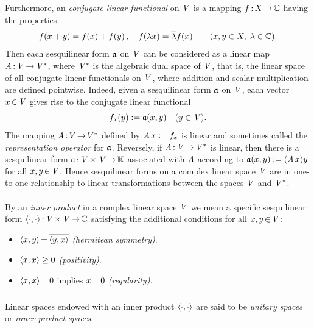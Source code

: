 \documentclass[11pt,twoside]{article}
\begin{document}
\subparagraph{}
Furthermore,
an \textit{conjugate linear functional} on $\mathit{V}$
is a mapping $f {\,:\,}X {\,\to\,} {\mathbb{C}}$ having the properties
\[
f(x+y) = f(x) + f(y)\,, \quad
f(\lambda x) = \overline{\lambda}f(x)
\quad \quad
(x,y \in X, \; \lambda \in {\mathbb{C}}).
\]
Then each sesquilinear form $\mathfrak{a}$ on $\mathit{V}$ can be considered
as a linear map $\mathit{A} {\,:\,}\mathit{V} {\,\to\,} \mathit{V}^*$,
where $\mathit{V}^*$ is the algebraic dual space of $\mathit{V}$,
that is,
the linear space of all conjugate linear functionals on $\mathit{V}$,
where addition and scalar multiplication are defined pointwise.
Indeed,
given a sesquilinear form $\mathfrak{a}$ on $\mathit{V}$,
each vector $x {\,\in\,} \mathit{V}$ gives rise to the conjugate linear functional
\[
f_x(y) := \mathfrak{a}(x,y) \quad (y \in \mathit{V}).
\]
The mapping $\mathit{A} {\,:\,}V {\,\to\,} V^*$ defined by $\mathit{A} \, x := f_x$ is linear
and sometimes called the \textit{representation operator} for $\mathfrak{a}$.
Reversely,
if $\mathit{A} {\,:\,}\mathit{V} {\,\to\,} \mathit{V}^*$ is linear,
then there is a sesquilinear form $\mathfrak{a} {\,:\,}\mathit{V} \times \mathit{V} {\,\to\,} {\mathbb{K}}$
associated with $\mathit{A}$ according to
$
\mathfrak{a}(x,y) := (\mathit{A} \,x) y$ for all $x,y {\,\in\,} \mathit{V}.
$
Hence sesquilinear forms on a complex linear space $\mathit{V}$
are in one-to-one relationship to linear trans\-formations
between the spaces $\mathit{V}$ and $\mathit{V}^*$.

\paragraph{}
By an \textit{inner product} in a complex linear space $\mathit{V}$
we mean a specific sesquilinear form
$\langle \cdot,\cdot \rangle {\,:\,}\mathit{V} {\,\times\,} \mathit{V} {\,\to\,} {\mathbb{C}}$
satisfying the additional conditions for all $x,y {\,\in\,} \mathit{V}$:

\begin{itemize}[leftmargin=35pt]
\item[(I-1)]
$\langle x,y \rangle {\,=\,} \overline{\langle y,x \rangle}$ \; \textit{(hermitean symmetry)}.

\item[(I-2)]
$\langle x,x \rangle \geq 0$ \; \textit{(positivity)}.

\item[(I-3)]
$\langle x,x \rangle {\,=\,} 0$ implies $x {\,=\,} 0$ \; \textit{(regularity)}.
\end{itemize}

\subparagraph{}
Linear spaces endowed with an inner product
$\langle \cdot,\cdot \rangle$ are said to be \textit{unitary spaces} or
\textit{inner product spaces}.
\end{document}
